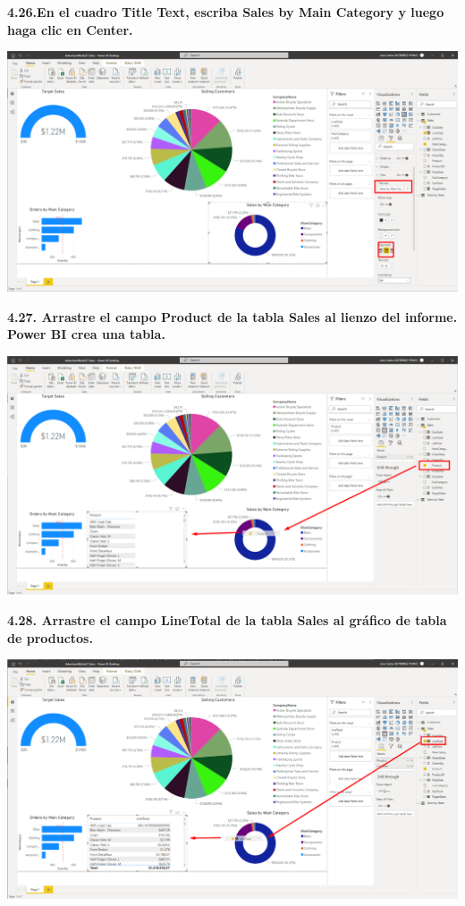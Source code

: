 \documentclass{article}
\begin{document}
\textbf{4.26.En el cuadro \textbf{Title Text}, escriba \textbf{Sales by Main Category} y luego haga clic en \textbf{Center}. }

    \begin{center}
		\includegraphics[width=14cm]{./images/102} 
	\end{center}

\newpage
\textbf{4.27. Arrastre el campo \textbf{Product} de la tabla \textbf{Sales} al lienzo del informe. Power BI crea una tabla.}

    \begin{center}
		\includegraphics[width=14cm]{./images/103} 
	\end{center}


\textbf{4.28. Arrastre el campo \textbf{LineTotal} de la tabla \textbf{Sales} al gráfico de tabla de productos.}

    \begin{center}
		\includegraphics[width=14cm]{./images/104} 
	\end{center}
\end{document}
